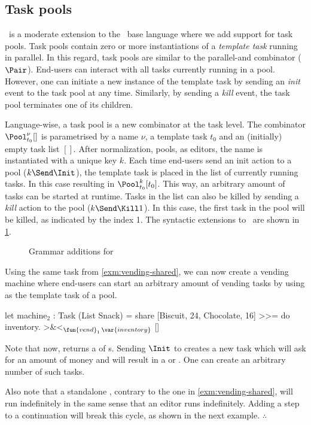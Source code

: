 \subsection{Task pools}

\DYNTOPHAT\ is a moderate extension to the \TOPHAT\ base language where we add support for task pools.
Task pools contain zero or more instantiations of a \emph{template task} running in parallel.
In this regard, task pools are similar to the parallel-and combinator ($\Pair$).
End-users can interact with all tasks currently running in a pool.
However, one can initiate a new instance of the template task by sending an \emph{init} event to the task pool at any time.
Similarly, by sending a \emph{kill} event, the task pool terminates one of its children.

Language-wise, a task pool is a new combinator at the task level.
The combinator $\Pool^\nu_{t_0} []$ is parametrised by a name $\nu$, a template task $t_0$ and an (initially) empty task list $[]$.
After normalization, pools, as editors, the name is instantiated with a unique key $k$.
Each time end-users send an init action to a pool ($k\Send\Init$), the template task is placed in the list of currently running tasks.
In this case resulting in $\Pool^k_{t_0} [t_0]$.
This way, an arbitrary amount of tasks can be started at runtime.
Tasks in the list can also be killed by sending a \emph{kill} action to the pool ($k\Send\Kill1$).
In this case, the first task in the pool will be killed, as indicated by the index 1.
The syntactic extensions to \TOPHAT\ are shown in \cref{fig:dynamic-grammar}.

\begin{figure}
  \caption{Grammar additions for \DYNTOPHAT}
  \label{fig:dynamic-grammar}
\end{figure}

\begin{example}
  \label{exm:vending-dynamic}
  Using the same  task from \cref{exm:vending-shared},
  we can now create a vending machine where end-users can start an arbitrary amount of vending tasks
  by using  as the template task of a pool.
  \begin{TASK}[emph={inventory}]
    let machine$_2$ : Task (List Snack) =
      share [{Biscuit, 24}, {Chocolate, 16}] >>= do inventory.
      >&<$_{\fun{vend}_1\,\var{inventory}}$ []
  \end{TASK}
  Note that now,  returns a  of s.
  Sending $\Init$ to  creates a new  task
  which will ask for an amount of money and will result in a  or .
  One can create an arbitrary number of such tasks.

  Also note that a standalone , contrary to the one in \cref{exm:vending-shared}, will run indefinitely
  in the same sense that an editor runs indefinitely.
  Adding a step to a continuation will break this cycle,
  as shown in the next example.
\hfill$\therefore$\end{example}

